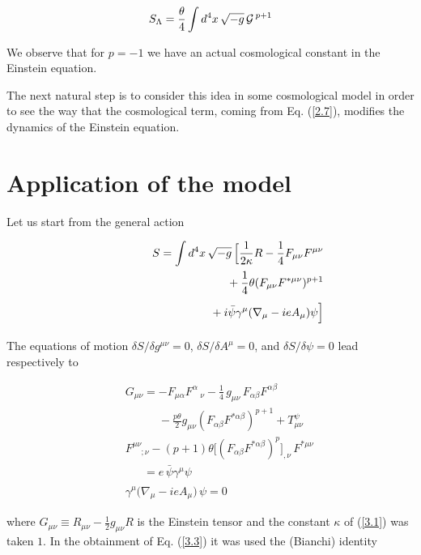 \documentclass[a4paper,twocolumn,prd,superscriptaddress,nofootinbib,showpacs]
{revtex4}
\begin{document}
\begin{equation}
S_\Lambda=\frac{\theta}{4}\int d^4x\,\sqrt{-g}\,{\cal G}\,^{p+1}
\label{2.7}
\end{equation}

\noindent
We observe that for $p=-1$ we have an actual cosmological constant in
the Einstein equation.

\medskip
The next natural step is to consider this idea in some cosmological
model in order to see the way that the cosmological term, coming from
Eq. (\ref{2.7}), modifies the dynamics of the Einstein equation.

\section{Application of the model}
\renewcommand{\theequation}{3.\arabic{equation}}
\setcounter{equation}{0}

Let us start from the general action

\begin{eqnarray}
&&S=\int d^4x\,\sqrt{-g}\,\Bigl[\frac{1}{2\kappa}R
-\frac{1}{4}F_{\mu\nu}F^{\mu\nu}
\nonumber\\
&&\phantom{S=\int d^4x\,\sqrt{-g}\,\Bigl[\kappa R}
+\frac{1}{4}\theta(F_{\mu\nu}F^{\ast\mu\nu})^{p+1}
\nonumber\\
&&\phantom{S=\int d^4x\,\sqrt{-g}\,\Bigl[\kappa R}
+i\bar\psi\gamma^\mu(\nabla_\mu-ieA_\mu)\psi\Bigr]
\label{3.1}
\end{eqnarray}

\noindent
The equations of motion $\delta S/\delta g^{\mu\nu}=0$, $\delta
S/\delta A^\mu=0$, and $\delta S/\delta\psi=0$ lead respectively to

\begin{eqnarray}
&&G_{\mu\nu}=-F_{\mu\alpha}F^\alpha\,_\nu
-\frac{1}{4}\,g_{\mu\nu}\,F_{\alpha\beta}F^{\alpha\beta}
\nonumber\\
&&\phantom{G_{\mu\nu}=}
-\frac{p\theta}{2}g_{\mu\nu}(F_{\alpha\beta}F^{\ast\alpha\beta})^{p+1}
+T_{\mu\nu}^\psi
\label{3.2}\\
&&F^{\mu\nu}_{\phantom{\mu\nu};\nu}
-(p+1)\theta\bigl[(F_{\alpha\beta}F^{\ast\alpha\beta})^p
\bigr]_{,\nu}\,F^{\ast\mu\nu}
\nonumber\\
&&\phantom{G_{\mu\nu}}
=e\,\bar\psi\gamma^\mu\psi
\label{3.3}\\
&&\gamma^\mu\bigl(\nabla_\mu-ieA_\mu\bigr)\,\psi=0
\label{3.4}
\end{eqnarray}

\noindent
where $G_{\mu\nu}\equiv R_{\mu\nu}-\frac{1}{2}g_{\mu\nu}R$ is the
Einstein tensor and the constant $\kappa$ of (\ref{3.1}) was taken
$1$. In the obtainment of Eq. (\ref{3.3}) it was used the (Bianchi)
identity
\end{document}
